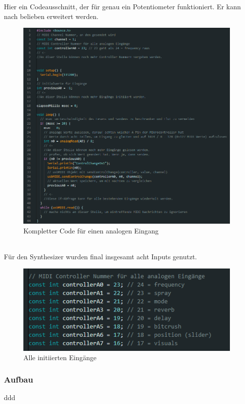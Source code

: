 \documentclass[12pt]{scrartcl}%
\theoremstyle{nonumberplain}
\begin{document}
\newpage
\noindent Hier ein Codeausschnitt, der für genau ein Potentiometer funktioniert. Er kann nach belieben erweitert werden.
\begin{figure}[h]
\centering
  \includegraphics[scale=0.5]{code_1}
  \caption{Kompletter Code für einen analogen Eingang}
\end{figure}\\
Für den Synthesizer wurden final insgesamt acht Inputs genutzt.
\begin{figure}[h]
\centering
  \includegraphics[scale=0.5]{code_2}
  \caption{Alle initiierten Eingänge}
\end{figure}
\newpage

\subsubsection{Aufbau}

ddd
\end{document}
